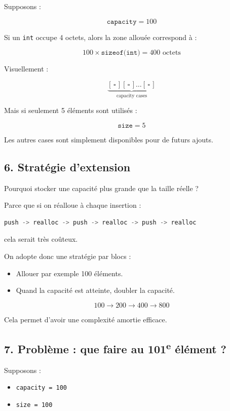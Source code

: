 Supposons :

\[
\texttt{capacity} = 100
\]

Si un \texttt{int} occupe 4 octets, alors la zone allouée correspond à :

\[
100 \times \texttt{sizeof(int)} = 400 \text{ octets}
\]

Visuellement :

\[
\underbrace{[\,\square\,][\,\square\,]\dots[\,\square\,]}_{\text{capacity cases}}
\]

Mais si seulement 5 éléments sont utilisés :

\[
\texttt{size} = 5
\]

Les autres cases sont simplement disponibles pour de futurs ajouts.

\subsection*{6. Stratégie d’extension}

Pourquoi stocker une capacité plus grande que la taille réelle ?

Parce que si on réalloue à chaque insertion :

\begin{lstlisting}[language=C]
push -> realloc -> push -> realloc -> push -> realloc
\end{lstlisting}

cela serait très coûteux.

On adopte donc une stratégie par blocs :

\begin{itemize}
    \item Allouer par exemple 100 éléments.
    \item Quand la capacité est atteinte, doubler la capacité.
\end{itemize}

\[
100 \rightarrow 200 \rightarrow 400 \rightarrow 800
\]

Cela permet d’avoir une complexité amortie efficace.

\subsection*{7. Problème : que faire au 101\textsuperscript{e} élément ?}

Supposons :

\begin{itemize}
    \item \texttt{capacity = 100}
    \item \texttt{size = 100}
\end{itemize}

